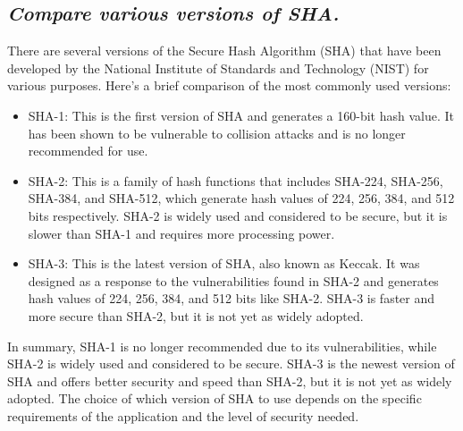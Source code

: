 \documentclass{article}
\begin{document}
\subsection{\textit{Compare various versions of SHA.}}
There are several versions of the Secure Hash Algorithm (SHA) that have been developed by the National Institute of Standards and Technology (NIST) for various purposes. Here's a brief comparison of the most commonly used versions:
\begin{itemize}
    \item SHA-1: This is the first version of SHA and generates a 160-bit hash value. It has been shown to be vulnerable to collision attacks and is no longer recommended for use.
    \item SHA-2: This is a family of hash functions that includes SHA-224, SHA-256, SHA-384, and SHA-512, which generate hash values of 224, 256, 384, and 512 bits respectively. SHA-2 is widely used and considered to be secure, but it is slower than SHA-1 and requires more processing power.
    \item SHA-3: This is the latest version of SHA, also known as Keccak. It was designed as a response to the vulnerabilities found in SHA-2 and generates hash values of 224, 256, 384, and 512 bits like SHA-2. SHA-3 is faster and more secure than SHA-2, but it is not yet as widely adopted.
\end{itemize}
In summary, SHA-1 is no longer recommended due to its vulnerabilities, while SHA-2 is widely used and considered to be secure. SHA-3 is the newest version of SHA and offers better security and speed than SHA-2, but it is not yet as widely adopted. The choice of which version of SHA to use depends on the specific requirements of the application and the level of security needed.
\end{document}
